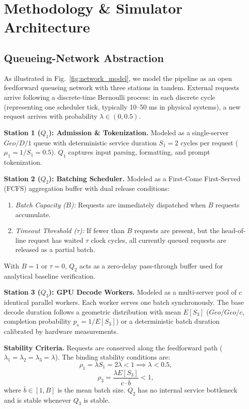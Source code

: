 \documentclass[conference]{IEEEtran}
\begin{document}
\section{Methodology \& Simulator Architecture}

\subsection{Queueing-Network Abstraction}
As illustrated in Fig.~\ref{fig:network_model}, we model the pipeline as an open feedforward queueing network with three stations in tandem. External requests arrive following a discrete-time Bernoulli process: in each discrete cycle (representing one scheduler tick, typically 10--50 ms in physical systems), a new request arrives with probability $\lambda \in (0, 0.5)$.

\textbf{Station 1 ($Q_1$): Admission \& Tokenization.} Modeled as a single-server $Geo/D/1$ queue with deterministic service duration $S_1 = 2$ cycles per request ($\mu_1 = 1/S_1 = 0.5$). $Q_1$ captures input parsing, formatting, and prompt tokenization.

\textbf{Station 2 ($Q_2$): Batching Scheduler.} Modeled as a First-Come First-Served (FCFS) aggregation buffer with dual release conditions:
\begin{enumerate}
    \item \emph{Batch Capacity ($B$):} Requests are immediately dispatched when $B$ requests accumulate.
    \item \emph{Timeout Threshold ($\tau$):} If fewer than $B$ requests are present, but the head-of-line request has waited $\tau$ clock cycles, all currently queued requests are released as a partial batch.
\end{enumerate}
With $B=1$ or $\tau=0$, $Q_2$ acts as a zero-delay pass-through buffer used for analytical baseline verification.

\textbf{Station 3 ($Q_3$): GPU Decode Workers.} Modeled as a multi-server pool of $c$ identical parallel workers. Each worker serves one batch synchronously. The base decode duration follows a geometric distribution with mean $E[S_3]$ ($Geo/Geo/c$, completion probability $p_s = 1/E[S_3]$) or a deterministic batch duration calibrated by hardware measurements.

\textbf{Stability Criteria.} Requests are conserved along the feedforward path ($\lambda_1 = \lambda_2 = \lambda_3 = \lambda$). The binding stability conditions are:
\begin{equation}
\rho_1 = \lambda S_1 = 2\lambda < 1 \implies \lambda < 0.5,
\end{equation}
\begin{equation}
\rho_3 = \frac{\lambda E[S_3]}{c \cdot \bar{b}} < 1,
\end{equation}
where $\bar{b} \in [1, B]$ is the mean batch size. $Q_2$ has no internal service bottleneck and is stable whenever $Q_3$ is stable.
\end{document}
